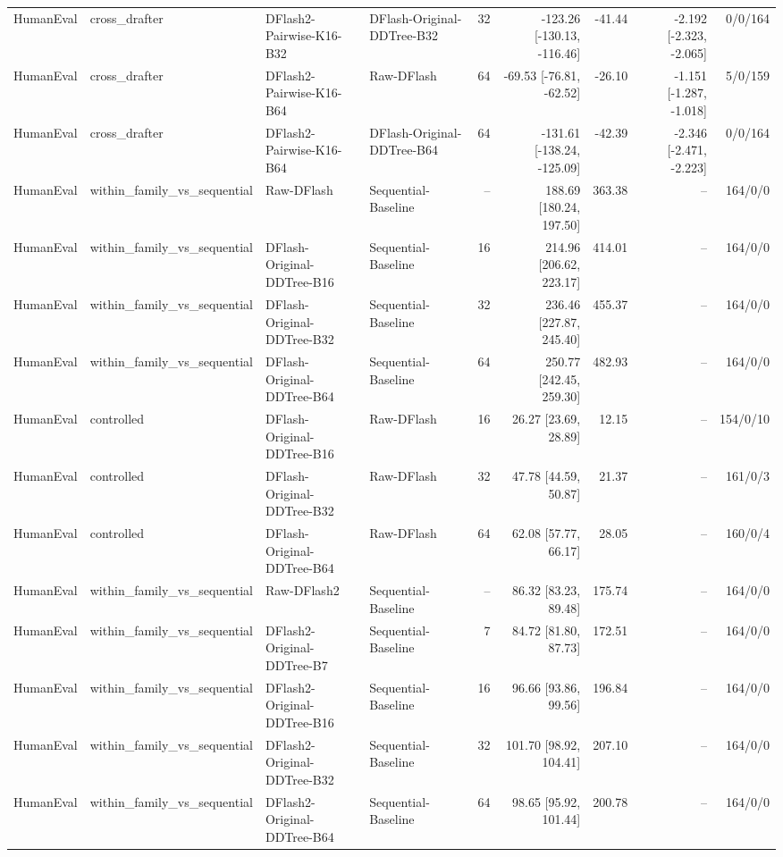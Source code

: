 \begin{longtable}{llllrrrrr}
HumanEval & cross\_drafter & DFlash2-Pairwise-K16-B32 & DFlash-Original-DDTree-B32 & 32 & -123.26 [-130.13, -116.46] & -41.44 & -2.192 [-2.323, -2.065] & 0/0/164 \\
HumanEval & cross\_drafter & DFlash2-Pairwise-K16-B64 & Raw-DFlash & 64 & -69.53 [-76.81, -62.52] & -26.10 & -1.151 [-1.287, -1.018] & 5/0/159 \\
HumanEval & cross\_drafter & DFlash2-Pairwise-K16-B64 & DFlash-Original-DDTree-B64 & 64 & -131.61 [-138.24, -125.09] & -42.39 & -2.346 [-2.471, -2.223] & 0/0/164 \\
HumanEval & within\_family\_vs\_sequential & Raw-DFlash & Sequential-Baseline & -- & 188.69 [180.24, 197.50] & 363.38 & -- & 164/0/0 \\
HumanEval & within\_family\_vs\_sequential & DFlash-Original-DDTree-B16 & Sequential-Baseline & 16 & 214.96 [206.62, 223.17] & 414.01 & -- & 164/0/0 \\
HumanEval & within\_family\_vs\_sequential & DFlash-Original-DDTree-B32 & Sequential-Baseline & 32 & 236.46 [227.87, 245.40] & 455.37 & -- & 164/0/0 \\
HumanEval & within\_family\_vs\_sequential & DFlash-Original-DDTree-B64 & Sequential-Baseline & 64 & 250.77 [242.45, 259.30] & 482.93 & -- & 164/0/0 \\
HumanEval & controlled & DFlash-Original-DDTree-B16 & Raw-DFlash & 16 & 26.27 [23.69, 28.89] & 12.15 & -- & 154/0/10 \\
HumanEval & controlled & DFlash-Original-DDTree-B32 & Raw-DFlash & 32 & 47.78 [44.59, 50.87] & 21.37 & -- & 161/0/3 \\
HumanEval & controlled & DFlash-Original-DDTree-B64 & Raw-DFlash & 64 & 62.08 [57.77, 66.17] & 28.05 & -- & 160/0/4 \\
HumanEval & within\_family\_vs\_sequential & Raw-DFlash2 & Sequential-Baseline & -- & 86.32 [83.23, 89.48] & 175.74 & -- & 164/0/0 \\
HumanEval & within\_family\_vs\_sequential & DFlash2-Original-DDTree-B7 & Sequential-Baseline & 7 & 84.72 [81.80, 87.73] & 172.51 & -- & 164/0/0 \\
HumanEval & within\_family\_vs\_sequential & DFlash2-Original-DDTree-B16 & Sequential-Baseline & 16 & 96.66 [93.86, 99.56] & 196.84 & -- & 164/0/0 \\
HumanEval & within\_family\_vs\_sequential & DFlash2-Original-DDTree-B32 & Sequential-Baseline & 32 & 101.70 [98.92, 104.41] & 207.10 & -- & 164/0/0 \\
HumanEval & within\_family\_vs\_sequential & DFlash2-Original-DDTree-B64 & Sequential-Baseline & 64 & 98.65 [95.92, 101.44] & 200.78 & -- & 164/0/0 \\

\end{longtable}
